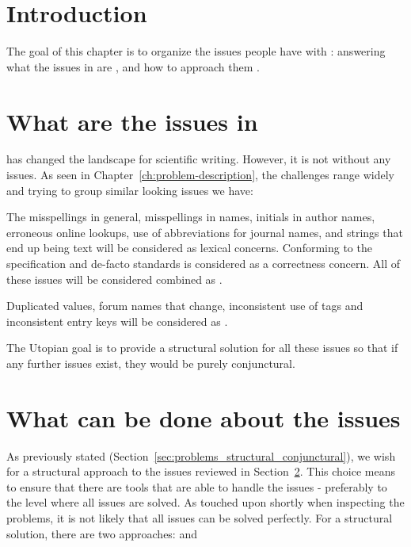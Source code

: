 
\section{Introduction}

The goal of this chapter is to organize the issues people have with
{\bibtex}: answering what the issues in {\bibtex} are
, and how to approach them
.


\section{What are the issues in {\bibtex}}
\label{sec:intro_what_issues}

{\bibtex} has changed the landscape for scientific writing.  However,
it is not without any issues.  As seen in
Chapter~\ref{ch:problem-description}, the challenges range widely and
trying to group similar looking issues we have:

The misspellings in general, misspellings in names, initials in author
names, erroneous online lookups, use of abbreviations for journal
names, and {\bibtex} strings that end up being text will be considered
as lexical concerns.  Conforming to the specification and de-facto
standards is considered as a correctness concern.  All of these issues
will be considered combined as .

Duplicated values, forum names that change, inconsistent use of tags
and inconsistent entry keys will be considered as .

The Utopian goal is to provide a structural solution for all these
issues so that if any further issues exist, they would be purely
conjunctural.


\section{What can be done about the {\bibtex} issues}
\label{sec:intro_what_to_do}

As previously stated
(Section~\ref{sec:problems_structural_conjunctural}), we wish for a
structural approach to the {\bibtex} issues reviewed in
Section~\ref{sec:intro_what_issues}.  This choice means to ensure that
there are tools that are able to handle the issues - preferably to the
level where all issues are solved.  As touched upon shortly when
inspecting the problems, it is not likely that all issues can be
solved perfectly.  For a structural solution, there are two
approaches: 
 and


